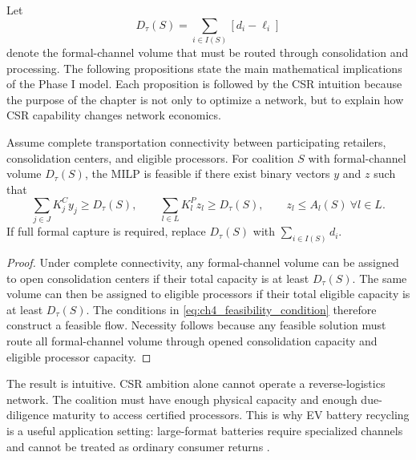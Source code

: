 Let
\begin{equation}
\label{eq:ch4_formal_demand}
D_\tau(S)=\sum_{i\in I(S)}\left[d_i-\ell_i\right]
\end{equation}
denote the formal-channel volume that must be routed through consolidation and processing. The following propositions state the main mathematical implications of the Phase I model. Each proposition is followed by the CSR intuition because the purpose of the chapter is not only to optimize a network, but to explain how CSR capability changes network economics.

\begin{proposition}
\label{prop:ch4_feasibility}
Assume complete transportation connectivity between participating retailers, consolidation centers, and eligible processors. For coalition $S$ with formal-channel volume $D_\tau(S)$, the MILP is feasible if there exist binary vectors $y$ and $z$ such that
\begin{equation}
\label{eq:ch4_feasibility_condition}
\sum_{j\in J}K_j^C y_j\geq D_\tau(S),
\qquad
\sum_{l\in L}K_l^P z_l\geq D_\tau(S),
\qquad
z_l\leq A_l(S)\ \forall l\in L.
\end{equation}
If full formal capture is required, replace $D_\tau(S)$ with $\sum_{i\in I(S)}d_i$.
\end{proposition}

\begin{proof}
Under complete connectivity, any formal-channel volume can be assigned to open consolidation centers if their total capacity is at least $D_\tau(S)$. The same volume can then be assigned to eligible processors if their total eligible capacity is at least $D_\tau(S)$. The conditions in \eqref{eq:ch4_feasibility_condition} therefore construct a feasible flow. Necessity follows because any feasible solution must route all formal-channel volume through opened consolidation capacity and eligible processor capacity.
\end{proof}

The result is intuitive. CSR ambition alone cannot operate a reverse-logistics network. The coalition must have enough physical capacity and enough due-diligence maturity to access certified processors. This is why EV battery recycling is a useful application setting: large-format batteries require specialized channels and cannot be treated as ordinary consumer returns \cite{EPA2026UsedLithiumIon,EPA2026UniversalWaste}.

